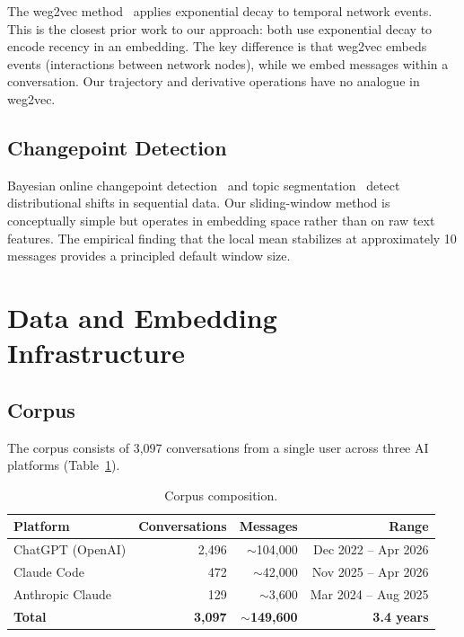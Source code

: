 \documentclass[11pt]{article}
\begin{document}
The weg2vec method~\citep{torricelli2020weg2vec} applies exponential decay to temporal network events. This is the closest prior work to our approach: both use exponential decay to encode recency in an embedding. The key difference is that weg2vec embeds events (interactions between network nodes), while we embed messages within a conversation. Our trajectory and derivative operations have no analogue in weg2vec.

\subsection{Changepoint Detection}

Bayesian online changepoint detection~\citep{adams2007bayesian} and topic segmentation~\citep{hearst1997texttiling,eisenstein2008bayesian} detect distributional shifts in sequential data. Our sliding-window method is conceptually simple but operates in embedding space rather than on raw text features. The empirical finding that the local mean stabilizes at approximately 10 messages provides a principled default window size.

\section{Data and Embedding Infrastructure}

\subsection{Corpus}

The corpus consists of 3,097 conversations from a single user across three AI platforms (Table~\ref{tab:corpus}).

\begin{table}[h]
\centering
\caption{Corpus composition.}
\label{tab:corpus}
\begin{tabular}{lrrr}
\toprule
Platform & Conversations & Messages & Range \\
\midrule
ChatGPT (OpenAI) & 2,496 & ${\sim}$104,000 & Dec 2022 -- Apr 2026 \\
Claude Code & 472 & ${\sim}$42,000 & Nov 2025 -- Apr 2026 \\
Anthropic Claude & 129 & ${\sim}$3,600 & Mar 2024 -- Aug 2025 \\
\midrule
\textbf{Total} & \textbf{3,097} & \textbf{${\sim}$149,600} & \textbf{3.4 years} \\
\bottomrule
\end{tabular}
\end{table}
\end{document}
